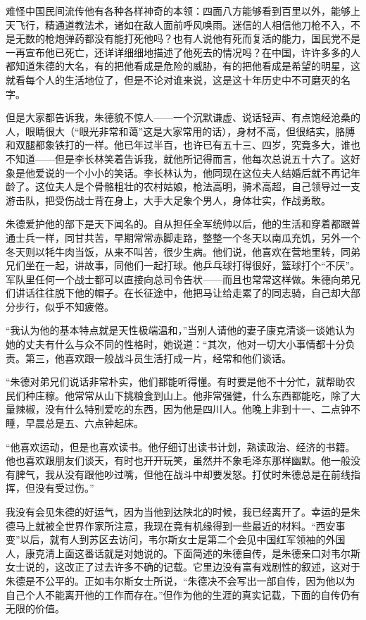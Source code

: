 \documentclass[10pt]{book}
\begin{document}
难怪中国民间流传他有各种各样神奇的本领：四面八方能够看到百里以外，能够上天飞行，精通道教法术，诸如在敌人面前呼风唤雨。迷信的人相信他刀枪不入，不是无数的枪炮弹药都没有能打死他吗？也有人说他有死而复活的能力，国民党不是一再宣布他已死亡，还详详细细地描述了他死去的情况吗？在中国，许许多多的人都知道朱德的大名，有的把他看成是危险的威胁，有的把他看成是希望的明星，这就看每个人的生活地位了，但是不论对谁来说，这是这十年历史中不可磨灭的名字。

但是大家都告诉我，朱德貌不惊人——一个沉默谦虚、说话轻声、有点饱经沧桑的人，眼睛很大（“眼光非常和蔼”这是大家常用的话），身材不高，但很结实，胳膊和双腿都象铁打的一样。他已年过半百，也许已有五十三、四岁，究竟多大，谁也不知道——但是李长林笑着告诉我，就他所记得而言，他每次总说五十六了。这好象是他爱说的一个小小的笑话。李长林认为，他同现在这位夫人结婚后就不再记年龄了。这位夫人是个骨骼粗壮的农村姑娘，枪法高明，骑术高超，自己领导过一支游击队，把受伤战士背在身上，大手大足象个男人，身体壮实，作战勇敢。

朱德爱护他的部下是天下闻名的。自从担任全军统帅以后，他的生活和穿着都跟普通士兵一样，同甘共苦，早期常常赤脚走路，整整一个冬天以南瓜充饥，另外一个冬天则以牦牛肉当饭，从来不叫苦，很少生病。他们说，他喜欢在营地里转，同弟兄们坐在一起，讲故事，同他们一起打球。他乒乓球打得很好，篮球打个“不厌”。军队里任何一个战士都可以直接向总司令告状——而且也常常这样做。朱德向弟兄们讲话往往脱下他的帽子。在长征途中，他把马让给走累了的同志骑，自己却大部分步行，似乎不知疲倦。

“我认为他的基本特点就是天性极端温和，”当别人请他的妻子康克清谈一谈她认为她的丈夫有什么与众不同的性格时，她说道：“其次，他对一切大小事情都十分负责。第三，他喜欢跟一般战斗员生活打成一片，经常和他们谈话。

“朱德对弟兄们说话非常朴实，他们都能听得懂。有时要是他不十分忙，就帮助农民们种庄稼。他常常从山下挑粮食到山上。他非常强健，什么东西都能吃，除了大量辣椒，没有什么特别爱吃的东西，因为他是四川人。他晚上非到十一、二点钟不睡，早晨总是五、六点钟起床。

“他喜欢运动，但是也喜欢读书。他仔细订出读书计划，熟读政治、经济的书籍。他也喜欢跟朋友们谈天，有时也开开玩笑，虽然并不象毛泽东那样幽默。他一般没有脾气，我从没有跟他吵过嘴，但他在战斗中却要发怒。打仗时朱德总是在前线指挥，但没有受过伤。”

我没有会见朱德的好运气，因为当他到达陕北的时候，我已经离开了。幸运的是朱德马上就被全世界作家所注意，我现在竟有机缘得到一些最近的材料。“西安事变”以后，就有人到苏区去访问，韦尔斯女士是第二个会见中国红军领袖的外国人，康克清上面这番话就是对她说的。下面简述的朱德自传，是朱德亲口对韦尔斯女士说的，这改正了过去许多不确的记载。它里边没有富有戏剧性的叙述，这对于朱德是不公平的。正如韦尔斯女士所说，“朱德决不会写出一部自传，因为他以为自己个人不能离开他的工作而存在。”但作为他的生涯的真实记载，下面的自传仍有无限的价值。
\end{document}
